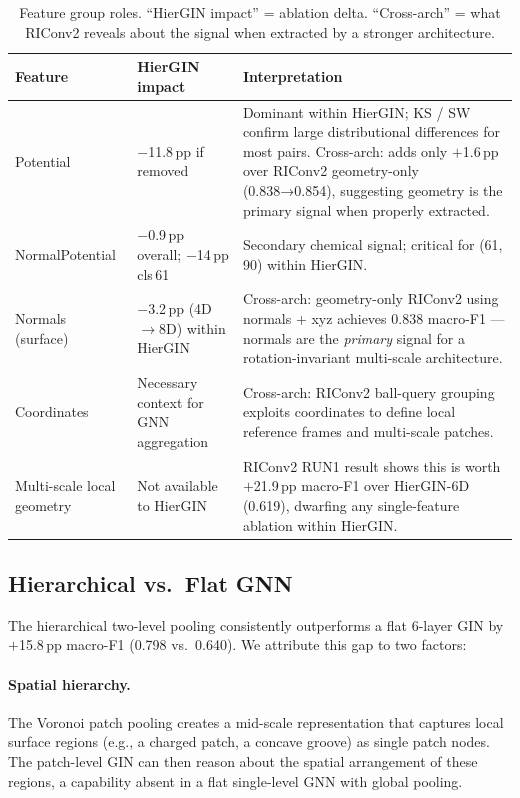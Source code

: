 \begin{table}[h]
  \centering
  \caption{Feature group roles. ``HierGIN impact'' = ablation delta.
           ``Cross-arch'' = what RIConv2 reveals about the signal when
           extracted by a stronger architecture.}
  \label{tab:feature_roles}
  \begin{tabular}{lp{2.6cm}p{5.8cm}}
    \toprule
    \textbf{Feature} & \textbf{HierGIN impact} & \textbf{Interpretation} \\
    \midrule
    Potential & $-$11.8\,pp if removed & Dominant within HierGIN; KS / SW confirm
      large distributional differences for most pairs.
      Cross-arch: adds only $+$1.6\,pp over RIConv2 geometry-only (0.838→0.854),
      suggesting geometry is the primary signal when properly extracted. \\[4pt]
    NormalPotential & $-$0.9\,pp overall; $-$14\,pp cls\,61 & Secondary chemical
      signal; critical for (61,\,90) within HierGIN. \\[4pt]
    Normals (surface) & $-$3.2\,pp (4D$\to$8D) within HierGIN &
      Cross-arch: geometry-only RIConv2 using normals + xyz achieves 0.838
      macro-F1 --- normals are the \emph{primary} signal for a rotation-invariant
      multi-scale architecture. \\[4pt]
    Coordinates & Necessary context for GNN aggregation & Cross-arch: RIConv2
      ball-query grouping exploits coordinates to define local reference frames
      and multi-scale patches. \\[4pt]
    Multi-scale local geometry & Not available to HierGIN & RIConv2 RUN1 result
      shows this is worth $+$21.9\,pp macro-F1 over HierGIN-6D (0.619),
      dwarfing any single-feature ablation within HierGIN. \\
    \bottomrule
  \end{tabular}
\end{table}

\subsection{Hierarchical vs.\ Flat GNN}

The hierarchical two-level pooling consistently outperforms a flat 6-layer GIN
by $+$15.8\,pp macro-F1 (0.798 vs.\ 0.640).
We attribute this gap to two factors:

\paragraph{Spatial hierarchy.}
The Voronoi patch pooling creates a mid-scale representation that captures
local surface regions (e.g., a charged patch, a concave groove) as single
patch nodes.
The patch-level GIN can then reason about the spatial arrangement of these
regions, a capability absent in a flat single-level GNN with global pooling.

